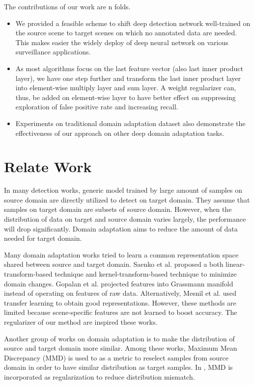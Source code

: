 \documentclass[runningheads]{llncs}
\begin{document}
\par
The contributions of our work are n folds.
\begin{itemize}
\item We provided a feasible scheme to shift deep detection network well-trained on the source scene to target scenes on which no annotated data are needed. This makes easier the widely deploy of deep neural network on various surveillance applications.
\item As most algorithms focus on the last feature vector (also last inner product layer), we have one step further and transform the last inner product layer into element-wise multiply layer and sum layer. A weight regularizer can, thus, be added on element-wise layer to have better effect on suppressing exploration of false positive rate and increasing recall.
\item Experiments on traditional domain adaptation dataset also demonstrate the effectiveness of our approach on other deep domain adaptation tasks.
\end{itemize}

\section{Relate Work}
\par
In many detection works, generic model trained by large amount of samples on source domain are directly utilized to detect on target domain. They assume that samples on target domain are subsets of source domain. However, when the distribution of data on target and source domain varies largely, the performance will drop significantly. Domain adaptation aims to reduce the amount of data needed for target domain.

Many domain adaptation works tried to learn a common representation space shared between source and target domain. Saenko et al. \cite{saenko2010adapting,kulis2011you} proposed a both linear-transform-based technique and kernel-transform-based technique to minimize domain changes. Gopalan et al. \cite{gopalan2011domain} projected features into Grassmann manifold instead of operating on features of raw data. Alternatively, Mesnil et al. \cite{mesnil2012unsupervised} used transfer learning to obtain good representations. However, these methods are limited because scene-specific features are not learned to boost accuracy. The regularizer of our method are inspired these works.

Another group of works \cite{huang2006correcting,gretton2009covariate,gong2013connecting} on domain adaptation is to make the distribution of source and target domain more similar. Among these works, Maximum Mean Discrepancy (MMD) is used to as a metric to reselect samples from source domain in order to have similar distribution as target samples. In \cite{ghifary2014domain}, MMD is incorporated as regularization to reduce distribution mismatch.
\end{document}
